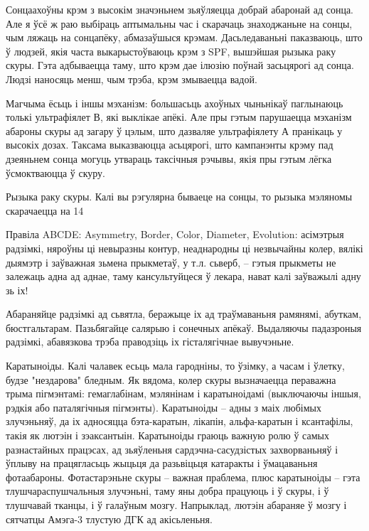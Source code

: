 Сонцаахоўны крэм з высокім значэньнем зьяўляецца добрай абаронай ад сонца. Але я ўсё ж раю выбіраць аптымальны час і скарачаць знаходжаньне на сонцы, чым ляжаць на сонцапёку, абмазаўшыся крэмам. Дасьледаваньні паказваюць, што ў людзей, якія часта выкарыстоўваюць крэм з SPF, вышэйшая рызыка раку скуры. Гэта адбываецца таму, што крэм дае ілюзію поўнай засьцярогі ад сонца. Людзі наносяць менш, чым трэба, крэм змываецца вадой.

Магчыма ёсьць і іншы мэханізм: большасьць ахоўных чыньнікаў паглынаюць толькі ультрафіялет В, які выклікае апёкі. Але пры гэтым парушаецца мэханізм абароны скуры ад загару ў цэлым, што дазваляе ультрафіялету А пранікаць у высокіх дозах. Таксама выказваюцца асьцярогі, што кампанэнты крэму пад дзеяньнем сонца могуць утвараць таксічныя рэчывы, якія пры гэтым лёгка ўсмоктваюцца ў скуру.

Рызыка раку скуры. Калі вы рэгулярна бываеце на сонцы, то рызыка мэляномы скарачаецца на 14%

Правіла ABCDE: Asymmetry, Border, Color, Diameter, Evolution: асімэтрыя радзімкі, няроўны ці невыразны контур, неаднародны ці незвычайны колер, вялікі дыямэтр і заўважная зьмена прыкметаў, у т.л. сьверб, – гэтыя прыкметы не залежаць адна ад аднае, таму кансультуйцеся ў лекара, нават калі заўважылі адну зь іх!

Абараняйце радзімкі ад сьвятла, беражыце іх ад траўмаваньня рамянямі, абуткам, бюстгальтарам. Пазьбягайце салярыю і сонечных апёкаў. Выдаляючы падазроныя радзімкі, абавязкова трэба праводзіць іх гісталягічнае вывучэньне.

Каратыноіды. Калі чалавек есьць мала гародніны, то ўзімку, а часам і ўлетку, будзе "нездарова" бледным. Як вядома, колер скуры вызначаецца пераважна трыма пігмэнтамі: гемаглабінам, мэлянінам і каратыноідамі (выключаючы іншыя, рэдкія або паталягічныя пігмэнты). Каратыноіды – адны з маіх любімых злучэньняў, да іх адносяцца бэта-каратын, лікапін, альфа-каратын і ксантафілы, такія як лютэін і зэаксантыін. Каратыноіды граюць важную ролю ў самых разнастайных працэсах, ад зьяўленьня сардэчна-сасудзістых захворваньняў і ўплыву на працягласьць жыцьця да разьвіцьця катаракты і ўмацаваньня фотаабароны. Фотастарэньне скуры – важная праблема, плюс каратыноіды – гэта тлушчараспушчальныя злучэньні, таму яны добра працуюць і ў скуры, і ў тлушчавай тканцы, і ў галаўным мозгу. Напрыклад, лютэін абараняе ў мозгу і сятчатцы Амэга-3 тлустую ДГК ад акісьленьня. 

